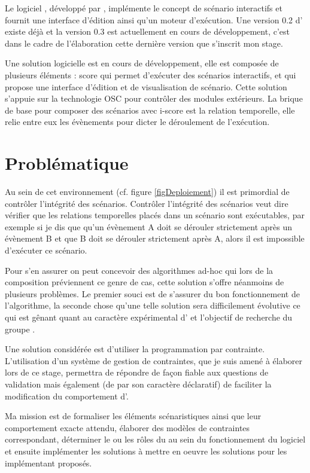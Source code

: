Le logiciel \iscore{}, développé par \ossia{}, implémente le concept de scénario interactifs et fournit une interface d'édition ainsi qu'un moteur d'exécution. Une version 0.2 d'\iscore{} existe déjà et la version 0.3 est actuellement en cours de développement, c'est dans le cadre de l'élaboration cette dernière version que s'inscrit mon stage. 



Une solution logicielle est en cours de développement, elle est composée de plusieurs éléments : score qui permet d'exécuter des scénarios interactifs, et \iscore{} qui propose une interface d'édition et de visualisation de scénario. Cette solution s'appuie sur la technologie OSC pour contrôler des modules extérieurs. La brique de base pour composer des scénarios avec i-score est la relation temporelle, elle relie entre eux les évènements pour dicter le déroulement de l'exécution.



\section*{Problématique}

Au sein de cet environnement (cf. figure \ref{figDeploiement}) il est primordial de contrôler l'intégrité des scénarios. Contrôler l'intégrité des scénarios veut dire vérifier que les relations temporelles placés dans un scénario sont exécutables, par exemple si je dis que qu'un évènement A doit se dérouler strictement après un évènement B et que B doit se dérouler strictement après A, alors il est impossible d'exécuter ce scénario.

Pour s'en assurer on peut concevoir des algorithmes ad-hoc qui lors de la composition préviennent ce genre de cas, cette solution s'offre néanmoins de plusieurs problèmes. Le premier souci est de s'assurer du bon fonctionnement de l'algorithme, la seconde chose qu'une telle solution sera difficilement évolutive ce qui est gênant quant au caractère expérimental d'\iscore{} et l'objectif de recherche du groupe \ossia{}.

Une solution considérée est d'utiliser la programmation par contrainte. L'utilisation d'un système de gestion de contraintes, que je suis amené à élaborer lors de ce stage, permettra de répondre de façon fiable aux questions de validation mais également (de par son caractère déclaratif) de faciliter la modification du comportement d'\iscore{}.

Ma mission est de formaliser les éléments scénaristiques ainsi que leur comportement exacte attendu, élaborer des modèles de contraintes correspondant, déterminer le ou les rôles du \csp{} au sein du fonctionnement du logiciel et ensuite implémenter les solutions à mettre en oeuvre les solutions pour les implémentant proposés.

\printglossary[type=\acronymtype]
 
\printglossary